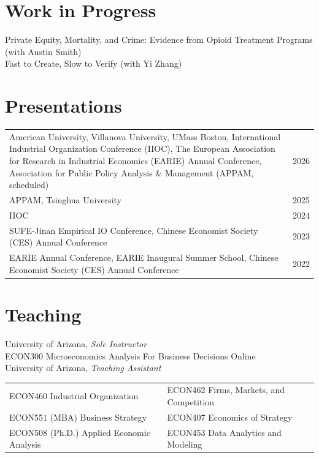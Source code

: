\documentclass[margin,line]{res}
\begin{document}
\begin{resume}
\section{\sc Work in Progress}

Private Equity, Mortality, and Crime: Evidence from Opioid Treatment Programs (with Austin Smith) \\
Fast to Create, Slow to Verify (with Yi Zhang)

\section{\sc Presentations}
\begin{tabular}{@{}p{5.6in}p{1in}}
     American University, Villanova University, UMass Boston, International Industrial Organization Conference (IIOC), The European Association for Research in Industrial Economics (EARIE) Annual Conference, Association for Public Policy Analysis \& Management (APPAM, scheduled) & 2026 \\
     APPAM, Tsinghua University & 2025 \\
     IIOC & 2024 \\
     SUFE‑Jinan Empirical IO Conference, Chinese Economist Society (CES) Annual Conference& 2023 \\
     EARIE Annual Conference, EARIE Inaugural Summer School, Chinese Economist Society (CES) Annual Conference& 2022
\end{tabular}

\section{\sc Teaching}
    University of Arizona, \textit{Sole Instructor} \\
    ECON300 Microeconomics Analysis For Business Decisions Online \vspace*{.05in} \\
    University of Arizona, \textit{Teaching Assistant }\\ 
\hspace*{-8px}
\begin{tabular}{ll}
ECON460 Industrial Organization & ECON462 Firms, Markets, and Competition \\
ECON551 (MBA) Business Strategy & ECON407 Economics of Strategy  \\
ECON508 (Ph.D.) Applied Economic Analysis  & ECON453 Data Analytics and Modeling \\ 
\end{tabular}


\end{resume}
\end{document}
